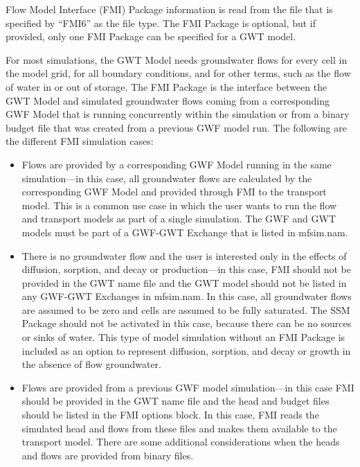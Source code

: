 Flow Model Interface (FMI) Package information is read from the file that is specified by ``FMI6'' as the file type.  The FMI Package is optional, but if provided, only one FMI Package can be specified for a GWT model.

For most simulations, the GWT Model needs groundwater flows for every cell in the model grid, for all boundary conditions, and for other terms, such as the flow of water in or out of storage.  The FMI Package is the interface between the GWT Model and simulated groundwater flows coming from a corresponding GWF Model that is running concurrently within the simulation or from a binary budget file that was created from a previous GWF model run.  The following are the different FMI simulation cases:

\begin{itemize}

\item Flows are provided by a corresponding GWF Model running in the same simulation---in this case, all groundwater flows are calculated by the corresponding GWF Model and provided through FMI to the transport model.  This is a common use case in which the user wants to run the flow and transport models as part of a single simulation.  The GWF and GWT models must be part of a GWF-GWT Exchange that is listed in mfsim.nam.

\item There is no groundwater flow and the user is interested only in the effects of diffusion, sorption, and decay or production---in this case, FMI should not be provided in the GWT name file and the GWT model should not be listed in any GWF-GWT Exchanges in mfsim.nam.  In this case, all groundwater flows are assumed to be zero and cells are assumed to be fully saturated.  The SSM Package should not be activated in this case, because there can be no sources or sinks of water.  This type of model simulation without an FMI Package is included as an option to represent diffusion, sorption, and decay or growth in the absence of flow groundwater.

\item Flows are provided from a previous GWF model simulation---in this case FMI should be provided in the GWT name file and the head and budget files should be listed in the FMI options block.  In this case, FMI reads the simulated head and flows from these files and makes them available to the transport model.  There are some additional considerations when the heads and flows are provided from binary files.


\end{itemize}
